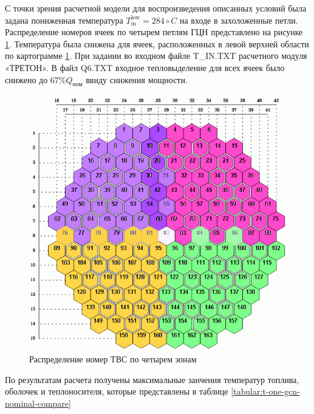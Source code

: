 С точки зрения расчетной модели для воспроизведения описанных условий была задана пониженная температура $T_{\text{in}}^{\text{low}}=284 \circ C$ на входе в захоложенные петли. Распределение номеров ячеек по четырем петлям ГЦН представлено на рисунке \ref{pic:treton-quarts}. Температура была снижена для ячеек, расположенных в левой верхней области по картограмме \ref{pic:treton-quarts}. При задании во входном файле T\_IN.TXT расчетного модуля «ТРЕТОН». В файл Q6.TXT входное тепловыделение для всех ячеек было снижено до 67\%$Q_{\text{ном}}$ ввиду снижения мощности. 

\begin{figure}[H]
	\begin{center}
		\includegraphics[scale=0.5]{quarts.jpg}
		\caption{Распределение номер ТВС по четырем зонам}
		\label{pic:treton-quarts}
	\end{center}
\end{figure}

По результатам расчета получены максимальные занчения температур топлива, оболочек и теплоносителя, которые представлены в таблице \ref{tabular:t-one-gcn-nominal-compare}

